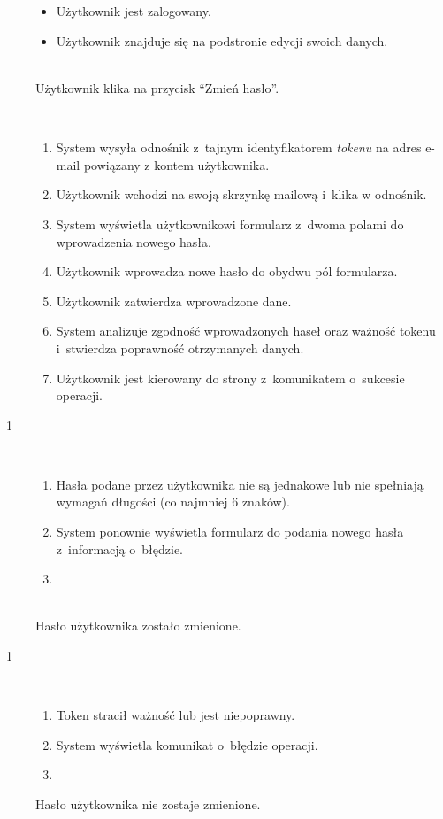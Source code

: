 \documentclass[11pt]{aghdpl}
\begin{document}
	\begin{description}
		\item[\useCaseAktor] \hfill \\
			\useCaseUzytkownik
		\item[\useCaseWarPocz] \hfill \\
			\begin{itemize}
				\item Użytkownik jest zalogowany.
				\item Użytkownik znajduje się na podstronie edycji swoich danych.
			\end{itemize}
		\item[\useCaseZdarzInicj] \hfill \\
			Użytkownik klika na przycisk ``Zmień hasło''.
		\item[\useCaseScenBaz] \hfill \\ 
			\begin{enumerate}
				\item System wysyła odnośnik z~tajnym identyfikatorem \emph{tokenu} na adres e-mail powiązany z kontem użytkownika.
				\item Użytkownik wchodzi na swoją skrzynkę mailową i~klika w odnośnik.
				\item System wyświetla użytkownikowi formularz z~dwoma polami do wprowadzenia nowego hasła.
				\item Użytkownik wprowadza nowe hasło do obydwu pól formularza.
				\item Użytkownik zatwierdza wprowadzone dane.
				\item System analizuje zgodność wprowadzonych haseł oraz ważność tokenu i~stwierdza poprawność otrzymanych danych.
				\item Użytkownik jest kierowany do strony z~komunikatem o~sukcesie operacji.
			\end{enumerate}
		\item[\useCaseScenAlt~1] \hfill \\
			\begin{enumerate}[label=7a\arabic*.]
				\item Hasła podane przez użytkownika nie są jednakowe lub nie spełniają wymagań długości (co najmniej 6 znaków).
				\item System ponownie wyświetla formularz do podania nowego hasła z~informacją o~błędzie.
				\item {}
			\end{enumerate}
		\item[\useCaseWarKonc] \hfill \\ 
			Hasło użytkownika zostało zmienione.
		\item[\useCaseWyjatek~1] \hfill \\
			\begin{enumerate}[label=7b\arabic*.]
				\item Token stracił ważność lub jest niepoprawny.
				\item System wyświetla komunikat o~błędzie operacji.
				\item \useCaseEnd
			\end{enumerate}
			Hasło użytkownika nie zostaje zmienione.
	\end{description}
	
\end{document}
